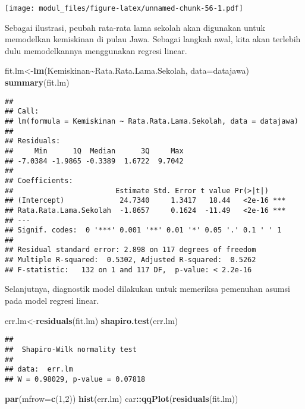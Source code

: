 \documentclass[
]{book}
\newenvironment{Shaded}{\begin{snugshade}}{\end{snugshade}}
\newcommand{\DataTypeTok}[1]{\textcolor[rgb]{0.13,0.29,0.53}{#1}}
\newcommand{\DecValTok}[1]{\textcolor[rgb]{0.00,0.00,0.81}{#1}}
\newcommand{\KeywordTok}[1]{\textcolor[rgb]{0.13,0.29,0.53}{\textbf{#1}}}
\newcommand{\NormalTok}[1]{#1}
\newcommand{\OperatorTok}[1]{\textcolor[rgb]{0.81,0.36,0.00}{\textbf{#1}}}
\begin{document}
\texttt{[image: modul\_files/figure-latex/unnamed-chunk-56-1.pdf]}

Sebagai ilustrasi, peubah rata-rata lama sekolah akan digunakan untuk memodelkan kemiskinan di pulau Jawa. Sebagai langkah awal, kita akan terlebih dulu memodelkannya menggunakan regresi linear.

\begin{Shaded}
\begin{Highlighting}[]
\NormalTok{fit.lm\textless{}{-}}\KeywordTok{lm}\NormalTok{(Kemiskinan}\OperatorTok{\textasciitilde{}}\NormalTok{Rata.Rata.Lama.Sekolah, }\DataTypeTok{data=}\NormalTok{datajawa)}
\KeywordTok{summary}\NormalTok{(fit.lm)}
\end{Highlighting}
\end{Shaded}

\begin{verbatim}
## 
## Call:
## lm(formula = Kemiskinan ~ Rata.Rata.Lama.Sekolah, data = datajawa)
## 
## Residuals:
##     Min      1Q  Median      3Q     Max 
## -7.0384 -1.9865 -0.3389  1.6722  9.7042 
## 
## Coefficients:
##                        Estimate Std. Error t value Pr(>|t|)    
## (Intercept)             24.7340     1.3417   18.44   <2e-16 ***
## Rata.Rata.Lama.Sekolah  -1.8657     0.1624  -11.49   <2e-16 ***
## ---
## Signif. codes:  0 '***' 0.001 '**' 0.01 '*' 0.05 '.' 0.1 ' ' 1
## 
## Residual standard error: 2.898 on 117 degrees of freedom
## Multiple R-squared:  0.5302, Adjusted R-squared:  0.5262 
## F-statistic:   132 on 1 and 117 DF,  p-value: < 2.2e-16
\end{verbatim}

Selanjutnya, diagnostik model dilakukan untuk memeriksa pemenuhan asumsi pada model regresi linear.

\begin{Shaded}
\begin{Highlighting}[]
\NormalTok{err.lm\textless{}{-}}\KeywordTok{residuals}\NormalTok{(fit.lm)}
\KeywordTok{shapiro.test}\NormalTok{(err.lm)}
\end{Highlighting}
\end{Shaded}

\begin{verbatim}
## 
##  Shapiro-Wilk normality test
## 
## data:  err.lm
## W = 0.98029, p-value = 0.07818
\end{verbatim}

\begin{Shaded}
\begin{Highlighting}[]
\KeywordTok{par}\NormalTok{(}\DataTypeTok{mfrow=}\KeywordTok{c}\NormalTok{(}\DecValTok{1}\NormalTok{,}\DecValTok{2}\NormalTok{))}
\KeywordTok{hist}\NormalTok{(err.lm)}
\NormalTok{car}\OperatorTok{::}\KeywordTok{qqPlot}\NormalTok{(}\KeywordTok{residuals}\NormalTok{(fit.lm))}
\end{Highlighting}
\end{Shaded}
\end{document}
